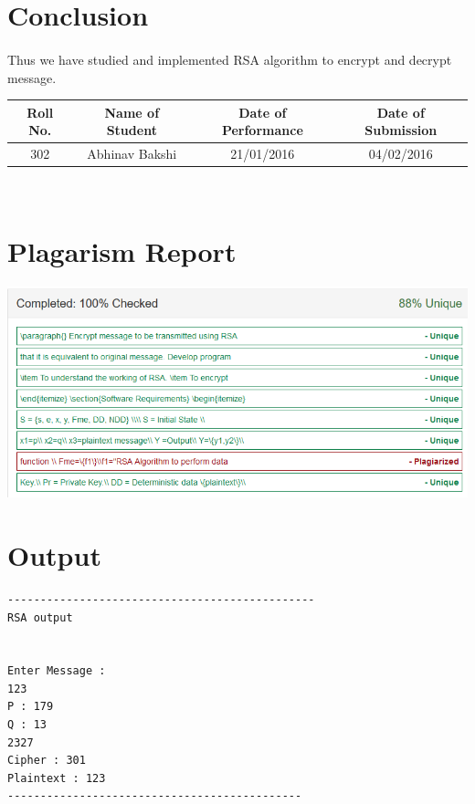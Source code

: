 \documentclass[a4paper,12pt]{article}
\begin{document}
\section{Conclusion}
	\paragraph{} Thus we have studied and implemented RSA algorithm to encrypt and decrypt message.
\vspace{20px}
\begin{center}
	\begin{tabular}
		{|c|c|c|c|}\hline
		{\bf Roll No.}		&{\bf Name of Student}		&{\bf Date of Performance}  				&{\bf Date of Submission}  \\ \hline
		{302}	&	{Abhinav Bakshi}& {21/01/2016} &  {04/02/2016} \\ \hline
	\end{tabular}\\ 
\end{center}

\section{Plagarism Report}
\includegraphics[width=\textwidth]{rsa}
\section{Output}
\begin{verbatim}
-----------------------------------------------
RSA output


Enter Message : 
123
P : 179
Q : 13
2327
Cipher : 301
Plaintext : 123
---------------------------------------------
\end{verbatim}
\end{document}
